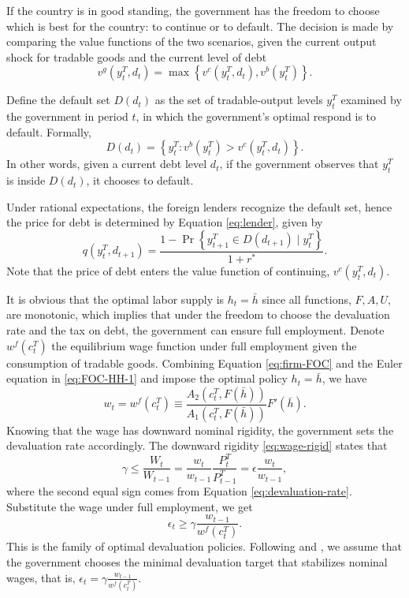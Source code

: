 If the country is in good standing, the government has the freedom to choose which is best for the country: to continue or to default. The decision is made by comparing the value functions of the two scenarios, given the current output shock for tradable goods and the current level of debt
\begin{equation}
    v^g(y^T_t, d_t) = \max\left\{
        v^c(y^T_t, d_t) ,
        v^b(y^T_t)
     \right\}.
\end{equation}

Define the default set $D(d_t)$ as the set of tradable-output levels $y^T_t$ examined by the government in period $t$, in which the government's optimal respond is to default. Formally,
\begin{equation}
    D(d_t) = \left\{ 
        y^T_t : v^b(y^T_t) > v^c(y^T_t, d_t)
     \right\}.
\end{equation}
In other words, given a current debt level $d_t$, if the government observes that $y^T_t$ is inside $D(d_t)$, it chooses to default.

Under rational expectations, the foreign lenders recognize the default set, hence the price for debt is determined by Equation \eqref{eq:lender}, given by
\begin{equation}
    q(y^T_t, d_{t+1}) =
    \frac{1 - \Pr\left\{ y^T_{t+1} \in D(d_{t+1}) \mid y^T_t \right\}}{1 + r^*}.
\end{equation}
Note that the price of debt enters the value function of continuing, $v^c(y^T_t, d_{t})$.

It is obvious that the optimal labor supply is $h_t = \bar{h}$ since all functions, $F, A, U$, are monotonic, which implies that under the freedom to choose the devaluation rate and the tax on debt, the government can ensure full employment. Denote $w^f(c^T_t)$ the equilibrium wage function under full employment given the consumption of tradable goods. Combining Equation \eqref{eq:firm-FOC} and the Euler equation in \eqref{eq:FOC-HH-1} and impose the optimal policy $h_t = \bar{h}$, we have
\begin{equation}
    w_t = w^f(c^T_t) \equiv \frac{A_2(c^T_t, F(\bar{h}))}{A_1(c^T_t, F(\bar{h}))} F'(\bar{h}).
\end{equation}
Knowing that the wage has downward nominal rigidity, the government sets the devaluation rate accordingly. The downward rigidity \eqref{eq:wage-rigid} states that
\begin{equation*}
    \gamma \le \frac{W_t}{W_{t-1}} = \frac{w_t}{w_{t-1}} \frac{P^T_t}{P^T_{t-1}} = \epsilon \frac{w_t}{w_{t-1}},
\end{equation*}
where the second equal sign comes from Equation \eqref{eq:devaluation-rate}. Substitute the wage under full employment, we get
\begin{equation}
    \epsilon_t \ge \gamma \frac{w_{t-1}}{w^f(c^T_t)}.
\end{equation}
This is the family of optimal devaluation policies. Following \citet{Na-18} and \citet*{Hinrichsen_2020-chapter4}, we assume that the government chooses the minimal devaluation target that stabilizes nominal wages, that is, $
    \epsilon_t = \gamma \frac{w_{t-1}}{w^f(c^T_t)}.
$